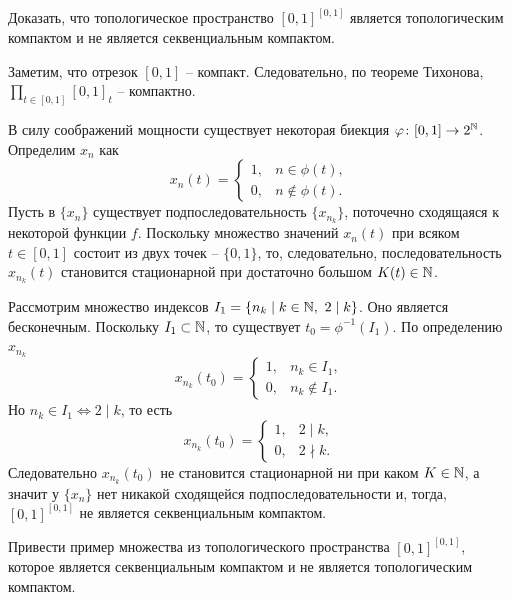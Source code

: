 \begin{task}[T5]
    Доказать, что топологическое пространство $[0, 1]^{[0, 1]}$ является топологическим компактом и не является секвенциальным компактом.
\end{task}
\begin{solve}
    Заметим, что отрезок $[0, 1]$ -- компакт. Следовательно, по теореме Тихонова, $\prod\limits_{t \in [0, 1]} [0, 1]_t$ -- компактно.

    В силу соображений мощности существует некоторая биекция $\varphi\colon [0, 1] \to 2^{\mathbb{N}}$. Определим $x_n$ как
    \[
        x_n(t) = \begin{cases}
                     1, & n \in \phi(t), \\
                     0, & n \notin \phi(t).
        \end{cases}
    \]
    Пусть в $\{x_n\}$ существует подпоследовательность $\{x_{n_k}\}$, поточечно сходящаяся к некоторой функции $f$. Поскольку множество значений $x_n(t)$ при всяком $t \in [0, 1]$ состоит из двух точек -- $\{0, 1\}$, то, следовательно, последовательность $x_{n_k}(t)$ становится стационарной при достаточно большом $K(t) \in \mathbb{N}$.

    Рассмотрим множество индексов $I_1 = \{n_k \mid k \in \mathbb{N}, \ 2 \mid k\}$. Оно является бесконечным. Поскольку $I_1 \subset \mathbb{N}$, то существует $t_0 = \phi^{-1}(I_1)$. По определению $x_{n_k}$
    \[
        x_{n_k}(t_0) = \begin{cases}
                           1, & n_k \in I_1, \\
                           0, & n_k \notin I_1.
        \end{cases}
    \]
    Но $n_k \in I_1 \Longleftrightarrow 2 \mid k$, то есть
    \[
        x_{n_k}(t_0) = \begin{cases}
                           1, & 2 \mid k, \\
                           0, & 2 \nmid k.
        \end{cases}
    \]
    Следовательно $x_{n_k}(t_0)$ не становится стационарной ни при каком $K \in \mathbb{N}$, а значит у $\{x_n\}$ нет никакой сходящейся подпоследовательности и, тогда, $[0, 1]^{[0, 1]}$ не является секвенциальным компактом.
\end{solve}
\begin{task}[T6]
    Привести пример множества из топологического пространства $[0, 1]^{[0, 1]}$, которое является секвенциальным компактом и не является топологическим компактом.
\end{task}
